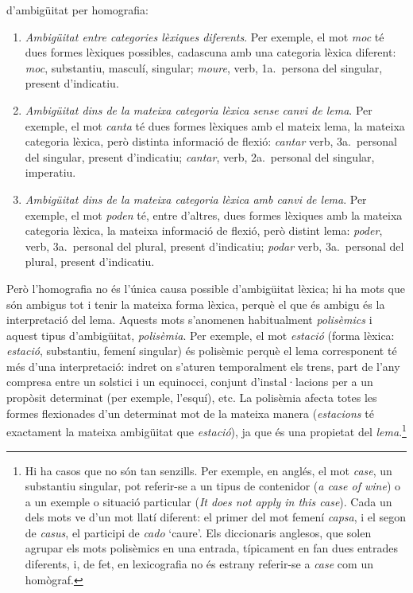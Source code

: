 d'ambigüitat per homografia:
\begin{enumerate}
\item \emph{Ambigüitat entre categories lèxiques diferents}. Per
  exemple, el mot \emph{moc} té dues formes lèxiques possibles,
  cadascuna amb una categoria lèxica diferent: \emph{moc}, substantiu,
  masculí, singular; \emph{moure}, verb, 1a.\ persona del singular,
  present d'indicatiu.
\item \emph{Ambigüitat dins de la mateixa categoria lèxica sense canvi
    de lema}. Per exemple, el mot \emph{canta} té dues formes lèxiques
  amb el mateix lema, la mateixa categoria lèxica, però distinta
  informació de flexió: \emph{cantar} verb, 3a.\ personal del
  singular, present d'indicatiu; \emph{cantar}, verb, 2a.\ personal
  del singular, imperatiu.
\item \emph{Ambigüitat dins de la mateixa categoria lèxica amb canvi
    de lema}. Per exemple, el mot \emph{poden} té, entre d'altres,
  dues formes lèxiques amb la mateixa categoria lèxica, la mateixa
  informació de flexió, però distint lema: \emph{poder}, verb, 3a.\
  personal del plural, present d'indicatiu; \emph{podar} verb, 3a.\
  personal del plural, present d'indicatiu.
\end{enumerate}

Però l'homografia no és l'única causa possible d'ambigüitat lèxica; hi
ha mots que són ambigus tot i tenir la mateixa forma lèxica, perquè el
que és ambigu és la interpretació del lema. Aquests mots s'anomenen
habitualment \emph{polisèmics} i aquest tipus d'ambigüitat,
\emph{polisèmia}. Per exemple, el mot \emph{estació} (forma lèxica:
\emph{estació}, substantiu, femení singular) és polisèmic perquè el
lema corresponent té més d'una interpretació: indret on s'aturen
temporalment els trens, part de l'any compresa entre un solstici i un
equinocci, conjunt d'instal·lacions per a un propòsit determinat (per
exemple, l'esquí), etc. La polisèmia afecta totes les formes
flexionades d'un determinat mot de la mateixa manera (\emph{estacions}
té exactament la mateixa ambigüitat que \emph{estació}), ja que és una
propietat del \emph{lema}.\footnote{Hi ha casos que no són tan
  senzills. Per exemple, en anglés, el mot \emph{case}, un substantiu
  singular, pot referir-se a un tipus de contenidor (\emph{a case of
    wine}) o a un exemple o situació particular (\emph{It does not
    apply in this case}). Cada un dels mots ve d'un mot llatí
  diferent: el primer del mot femení \emph{capsa}, i el segon de
  \emph{casus}, el participi de \emph{cado} `caure'. Els diccionaris
  anglesos, que solen agrupar els mots polisèmics en una entrada,
  típicament en fan dues entrades diferents, i, de fet, en
  lexicografia no és estrany referir-se a \emph{case} com un
  homògraf.}

